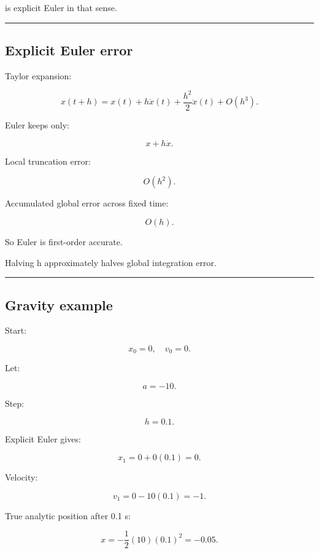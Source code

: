 is explicit Euler in that sense.

\begin{center}\rule{0.5\linewidth}{0.5pt}\end{center}

\subsection{Explicit Euler error}\label{06-engine-ii-ch037-explicit-euler-error}

\hypertarget{06-engine-ii-ch037-explicit-euler-error}{}

Taylor expansion:

\[
x(t+h)
=
x(t)
+
h\dot x(t)
+
\frac{h^2}{2}\ddot x(t)
+
O(h^3).
\]

Euler keeps only:

\[
x+h\dot x.
\]

Local truncation error:

\[
O(h^2).
\]

Accumulated global error across fixed time:

\[
\boxed{
O(h).
}
\]

So Euler is first-order accurate.

Halving h approximately halves global integration error.

\begin{center}\rule{0.5\linewidth}{0.5pt}\end{center}

\subsection{Gravity example}\label{06-engine-ii-ch037-gravity-example}

\hypertarget{06-engine-ii-ch037-gravity-example}{}

Start:

\[
x_0=0,\quad v_0=0.
\]

Let:

\[
a=-10.
\]

Step:

\[
h=0.1.
\]

Explicit Euler gives:

\[
x_1
=
0+0(0.1)
=
0.
\]

Velocity:

\[
v_1
=
0-10(0.1)
=
-1.
\]

True analytic position after 0.1 s:

\[
x=-\frac12(10)(0.1)^2=-0.05.
\]

